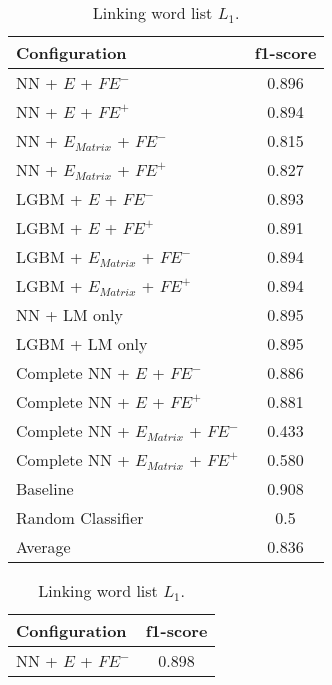 \newpage

\begin{table}[h]
  	\tiny
  	\centering
	\begin{subtable}{.5\textwidth}
		\centering
  		\renewcommand{\arraystretch}{1.4}
   		\begin{tabular}{|| l || c ||}
   			\hline
   			{Configuration} & {f1-score} \\
   			\hline\hline
   			NN + $E$ + $\textit{FE}^-$ &  0.896 \\
 			\hline
 			NN + $E$ + $\textit{FE}^+$ & 0.894 \\
 			\hline
 			NN + $E_{Matrix}$ + $\textit{FE}^-$ & 0.815 \\
 			\hline
 			NN + $E_{Matrix}$ + $\textit{FE}^+$ & 0.827 \\
 			\hline
 			LGBM + $E$ + $\textit{FE}^-$ & 0.893 \\
 			\hline
 			LGBM + $E$ + $\textit{FE}^+$ & 0.891 \\
 			\hline
 			LGBM + $E_{Matrix}$ + $\textit{FE}^-$ & 0.894 \\
 			\hline
 			LGBM + $E_{Matrix}$ + $\textit{FE}^+$ & 0.894 \\
 			\hline
 			NN + LM only & 0.895 \\
 			\hline
 			LGBM + LM only & 0.895 \\
 			\hline
 			Complete NN + $E$ + $\textit{FE}^-$ & 0.886 \\
 			\hline
 			Complete NN + $E$ + $\textit{FE}^+$ & 0.881 \\
 			\hline
 			Complete NN + $E_{Matrix}$ + $\textit{FE}^-$ & 0.433 \\
 			\hline
 			Complete NN + $E_{Matrix}$ + $\textit{FE}^+$ & 0.580 \\
 			\hline
 			Baseline & 0.908 \\
 			\hline
 			Random Classifier & 0.5 \\
 			\hline
 			\hline
 			Average & 0.836 \\
 			\hline
		\end{tabular}
		\renewcommand{\arraystretch}{1}
  		\caption{Linking word list $L_1$.}%
  	\end{subtable}%
  	\begin{subtable}{.5\textwidth}
		\centering
  		\renewcommand{\arraystretch}{1.4}
   		\begin{tabular}{|| l || c ||}
   			\hline
   			{Configuration} & {f1-score} \\
   			\hline\hline
   			NN + $E$ + $\textit{FE}^-$ &  0.898 \\

\end{tabular}
\end{subtable}
\end{table}
